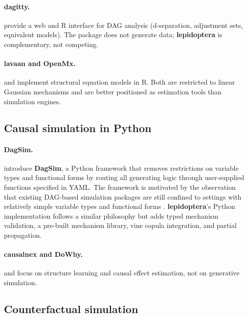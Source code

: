 \documentclass[12pt,a4paper]{article}
\newcommand{\pkg}[1]{\textbf{#1}}
\newcommand{\proglang}[1]{\textsf{#1}}
\begin{document}
\paragraph{\pkg{dagitty}.}
\citet{textor2016dagitty} provide a web and \proglang{R} interface for DAG
analysis (d-separation, adjustment sets, equivalent models). The package does not
generate data; \pkg{lepidoptera} is complementary, not competing.

\paragraph{\pkg{lavaan} and \pkg{OpenMx}.}
\citet{rosseel2012lavaan} and \citet{neale2016openmx} implement structural equation
models in \proglang{R}. Both are restricted to linear Gaussian mechanisms and are
better positioned as estimation tools than simulation engines.

\subsection{Causal simulation in \proglang{Python}}

\paragraph{\pkg{DagSim}.}
\citet{alhajj2023dagsim} introduce \pkg{DagSim}, a \proglang{Python} framework
that removes restrictions on variable types and functional forms by routing all
generating logic through user-supplied functions specified in YAML. The framework
is motivated by the observation that existing DAG-based simulation packages are
still confined to settings with relatively simple variable types and functional
forms \citep{alhajj2023dagsim}. \pkg{lepidoptera}'s Python implementation follows
a similar philosophy but adds typed mechanism validation, a pre-built mechanism
library, vine copula integration, and partial propagation.

\paragraph{\pkg{causalnex} and \pkg{DoWhy}.}
\citet{beaumont2021causalnex} and \citet{sharma2020dowhy} focus on structure
learning and causal effect estimation, not on generative simulation.

\subsection{Counterfactual simulation}
\end{document}
